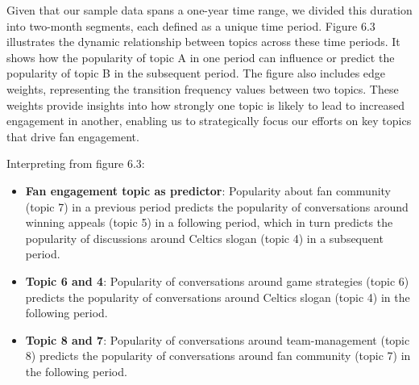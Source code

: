 \documentclass[
]{book}
\begin{document}
Given that our sample data spans a one-year time range, we divided this duration into two-month segments, each defined as a unique time period. Figure 6.3 illustrates the dynamic relationship between topics across these time periods. It shows how the popularity of topic A in one period can influence or predict the popularity of topic B in the subsequent period. The figure also includes edge weights, representing the transition frequency values between two topics. These weights provide insights into how strongly one topic is likely to lead to increased engagement in another, enabling us to strategically focus our efforts on key topics that drive fan engagement.

Interpreting from figure 6.3:

\begin{itemize}
\item
  \textbf{Fan engagement topic as predictor}: Popularity about fan community (topic 7) in a previous period predicts the popularity of conversations around winning appeals (topic 5) in a following period, which in turn predicts the popularity of discussions around Celtics slogan (topic 4) in a subsequent period.
\item
  \textbf{Topic 6 and 4}: Popularity of conversations around game strategies (topic 6) predicts the popularity of conversations around Celtics slogan (topic 4) in the following period.
\item
  \textbf{Topic 8 and 7}: Popularity of conversations around team-management (topic 8) predicts the popularity of conversations around fan community (topic 7) in the following period.
\end{itemize}
\end{document}
